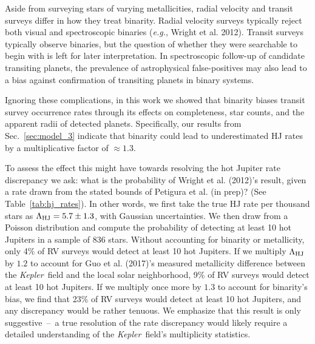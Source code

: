 Aside from surveying stars of varying metallicities, radial velocity and 
transit surveys differ in how they treat binarity.
Radial velocity surveys typically reject both visual and spectroscopic binaries
({\it e.g.}, Wright et al. 2012).
Transit surveys typically observe binaries, but the question of whether they 
were searchable to begin with is left for later interpretation.
In spectroscopic follow-up of candidate transiting planets, the prevalence of 
astrophysical false-positives may also lead to a bias against confirmation of 
transiting planets in binary systems.

Ignoring these complications, in this work we showed that
binarity biases transit survey occurrence rates through its effects on 
completeness, star counts, and the apparent radii of detected planets.
Specifically, our results from Sec.~\ref{sec:model_3} indicate that binarity 
could lead to underestimated HJ rates by a multiplicative factor of $\approx 
1.3$.

To assess the effect this might have towards resolving the hot Jupiter rate 
discrepancy we ask:
what is the probability of Wright et al. (2012)'s result, given a rate drawn 
from the stated bounds of Petigura et al. (in prep)? (See 
Table~\ref{tab:hj_rates}).
In other words, we first take the true HJ rate per thousand stars as 
$\Lambda_{\rm HJ} = 5.7 \pm 1.3$, with Gaussian uncertainties. 
We then draw from a Poisson distribution and compute the probability of 
detecting at least 10 hot Jupiters in a sample of 836 stars.
Without accounting for binarity or metallicity, only 4\% of RV surveys would 
detect at least 10 hot Jupiters.
If we multiply $\Lambda_{\rm HJ}$ by $1.2$ to account for Guo et al. 
(2017)'s measured metallicity difference between the {\it Kepler}\ field and 
the local solar neighborhood, 9\% of RV surveys would detect at least 10 hot 
Jupiters.
If we multiply once more by $1.3$ to account for binarity's bias, we find that
23\% of RV surveys would detect at least 10 hot Jupiters, and any discrepancy 
would be rather tenuous.
We emphasize that this result is only suggestive~--~a true resolution of the 
rate discrepancy would likely require a detailed understanding of the {\it 
Kepler}\ field's multiplicity statistics.


